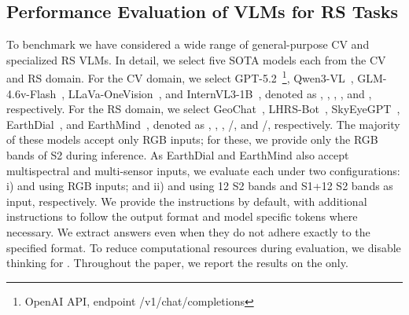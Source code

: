 \subsection{Performance Evaluation of VLMs for RS Tasks}
To benchmark \bentxt{} we have considered a wide range of general-purpose \ac{CV} and specialized \ac{RS} \acp{VLM}. In detail, we select five \ac{SOTA} models each from the \ac{CV} and \ac{RS} domain. For the \ac{CV} domain, we select GPT-5.2~\cite{openai2025gpt5}\footnote{OpenAI API, endpoint /v1/chat/completions}, Qwen3-VL~\cite{bai2025qwen3}, GLM-4.6v-Flash~\cite{hong2025glm}, LLaVa-OneVision~\cite{li2024llavaonevision}, and InternVL3-1B~\cite{zhu2025internvl3}, denoted as \gptABBRns, \qwenABBRns, \glmABBRns, \llavaABBRns, and \internvlABBRns, respectively. For the \ac{RS} domain, we select GeoChat~\cite{kuckreja2024geochat}, LHRS-Bot~\cite{muhtar2024lhrs}, SkyEyeGPT~\cite{zhan2025skyeyegpt}, EarthDial~\cite{soni2025earthdial}, and EarthMind~\cite{shu2025earthmind}, denoted as \geochatABBRns, \lhrsbotABBRns, \skyeyegptABBRns, \earthdialrgbABBRns/\earthdialmsABBRns, and \earthmindrgbABBRns/\earthmindsarmsABBRns, respectively.
The majority of these models accept only \ac{RGB} inputs; for these, we provide only the \ac{RGB} bands of \ac{S2} during inference.
As EarthDial and EarthMind also accept multispectral and multi-sensor inputs, we evaluate each under two configurations:
i) \earthdialrgbABBRns{} and \earthmindrgbABBRns{} using \ac{RGB} inputs; and
ii) \earthdialmsABBRns{} and \earthmindsarmsABBRns{} using 12 \ac{S2} bands and \ac{S1}+12 \ac{S2} bands as input, respectively.
We provide the \bentxt{} instructions by default, with additional instructions to follow the output format and model specific tokens where necessary. 
We extract answers even when they do not adhere exactly to the specified format. 
To reduce computational resources during evaluation, we disable thinking for \glmABBRns.
Throughout the paper, we report the results on the \bench{} only.

